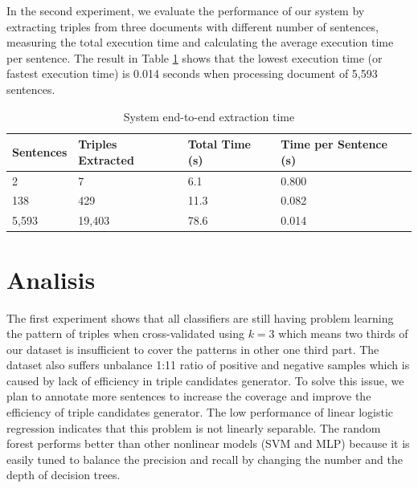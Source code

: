 In the second experiment, we evaluate the performance of our system by extracting triples from three documents with different number of sentences, measuring the total execution time and calculating the average execution time per sentence. The result in Table \ref{tab:system_extraction_time} shows that the lowest execution time (or fastest execution time) is 0.014 seconds when processing document of 5,593 sentences.

\begin{table}
	\caption{System end-to-end extraction time}
	\label{tab:system_extraction_time}
	\centering
	\begin{tabular}{l p{1.2cm} p{1.2cm} p{1.2cm}}
		\hline
		\textbf{Sentences} & \textbf{Triples Extracted} & \textbf{Total Time (s)} & \textbf{Time per Sentence (s)} \\
		\hline
		2 & 7 & 6.1 & 0.800 \\
		138 & 429 & 11.3 & 0.082 \\
		5,593 & 19,403 & 78.6 & 0.014 \\
		\hline
	\end{tabular}
\end{table}


\section{Analisis}

The first experiment shows that all classifiers are still having problem learning the pattern of triples when cross-validated using $k=3$ which means two thirds of our dataset is insufficient to cover the patterns in other one third part. The dataset also suffers unbalance 1:11 ratio of positive and negative samples which is caused by lack of efficiency in triple candidates generator. To solve this issue, we plan to annotate more sentences to increase the coverage and improve the efficiency of triple candidates generator. The low performance of linear logistic regression indicates that this problem is not linearly separable. The random forest performs better than other nonlinear models (SVM and MLP) because it is easily tuned to balance the precision and recall by changing the number and the depth of decision trees.

